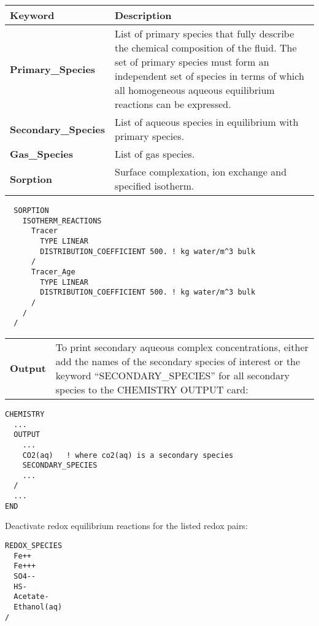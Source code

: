 \begin{center}
\begin{tabularx}{\linewidth}{lX}
\toprule
\bf Keyword & \bf Description\\
\midrule
\bf Primary\_Species & List of primary species that fully describe the chemical composition of the fluid. The set of primary species must form an independent set of species in terms of which all homogeneous aqueous equilibrium reactions can be expressed.\\
\midrule
\bf Secondary\_Species & List of aqueous species in equilibrium with primary species.\\
\midrule
\bf Gas\_Species & List of gas species.\\
\midrule
\bf Sorption & Surface complexation, ion exchange and specified isotherm.\\
\end{tabularx}

\begin{mdframed}

\begin{verbatim}
  SORPTION
    ISOTHERM_REACTIONS
      Tracer
        TYPE LINEAR 
        DISTRIBUTION_COEFFICIENT 500. ! kg water/m^3 bulk
      /
      Tracer_Age
        TYPE LINEAR 
        DISTRIBUTION_COEFFICIENT 500. ! kg water/m^3 bulk
      /
    /
  /
\end{verbatim}
\end{mdframed}

\end{center}

\begin{center}
\begin{tabularx}{\linewidth}{lX}
\midrule
\bf Output &
To print secondary aqueous complex concentrations, either add the names of the secondary species of interest or the keyword ``SECONDARY\_SPECIES'' for all secondary species to the CHEMISTRY OUTPUT card:
\end{tabularx}
\end{center}

\begin{mdframed}

\begin{verbatim}
CHEMISTRY
  ...
  OUTPUT
    ...
    CO2(aq)   ! where co2(aq) is a secondary species
    SECONDARY_SPECIES
    ...
  /
  ...
END
\end{verbatim}

Deactivate redox equilibrium reactions for the listed redox pairs:
\begin{verbatim}
REDOX_SPECIES
  Fe++
  Fe+++
  SO4--
  HS-
  Acetate-
  Ethanol(aq)
/
\end{verbatim}
\end{mdframed}


